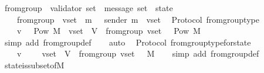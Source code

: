 \begin{isabellebody}
\ from{\isacharunderscore}group\ {\isacharcolon}{\isacharcolon}\ {\isachardoublequoteopen}{\isacharparenleft}validator\ set\ {\isacharasterisk}\ message\ set{\isacharparenright}\ {\isasymRightarrow}\ state{\isachardoublequoteclose}\isanewline
\ \ \isanewline
\ \ \ \ {\isachardoublequoteopen}from{\isacharunderscore}group\ {\isacharequal}\ {\isacharparenleft}{\isasymlambda}{\isacharparenleft}v{\isacharunderscore}set{\isacharcomma}\ {\isasymsigma}{\isacharparenright}{\isachardot}\ {\isacharbraceleft}m\ {\isasymin}\ {\isasymsigma}{\isachardot}\ sender\ m\ {\isasymin}\ v{\isacharunderscore}set{\isacharbraceright}{\isacharparenright}{\isachardoublequoteclose}\isanewline
\isanewline
{}\isamarkupfalse%
\ {\isacharparenleft}\ Protocol{\isacharparenright}\ from{\isacharunderscore}group{\isacharunderscore}type\ {\isacharcolon}\isanewline
\ \ {\isachardoublequoteopen}{\isasymforall}\ {\isasymsigma}\ v{\isachardot}\ {\isasymsigma}\ {\isasymin}\ Pow\ M\ {\isasymand}\ v{\isacharunderscore}set\ {\isasymsubseteq}\ V\ {\isasymlongrightarrow}\ from{\isacharunderscore}group\ {\isacharparenleft}v{\isacharunderscore}set{\isacharcomma}\ {\isasymsigma}{\isacharparenright}\ {\isasymin}\ Pow\ M{\isachardoublequoteclose}\isanewline
%
\isadelimproof
\ \ %
\endisadelimproof
%
\isatagproof
{}\isamarkupfalse%
\ {\isacharparenleft}simp\ add{\isacharcolon}\ from{\isacharunderscore}group{\isacharunderscore}def{\isacharparenright}\isanewline
\ \ \isamarkupfalse%
\ auto%
\endisatagproof
{\isafoldproof}%
%
\isadelimproof
\isanewline
%
\endisadelimproof
\isanewline
{}\isamarkupfalse%
\ {\isacharparenleft}\ Protocol{\isacharparenright}\ from{\isacharunderscore}group{\isacharunderscore}type{\isacharunderscore}for{\isacharunderscore}state\ {\isacharcolon}\isanewline
\ \ {\isachardoublequoteopen}{\isasymforall}\ {\isasymsigma}\ v{\isachardot}\ {\isasymsigma}\ {\isasymin}\ {\isasymSigma}\ {\isasymand}\ v{\isacharunderscore}set\ {\isasymsubseteq}\ V\ {\isasymlongrightarrow}\ from{\isacharunderscore}group\ {\isacharparenleft}v{\isacharunderscore}set{\isacharcomma}\ {\isasymsigma}{\isacharparenright}\ {\isasymsubseteq}\ M{\isachardoublequoteclose}\isanewline
%
\isadelimproof
\ \ %
\endisadelimproof
%
\isatagproof
{}\isamarkupfalse%
\ {\isacharparenleft}simp\ add{\isacharcolon}\ from{\isacharunderscore}group{\isacharunderscore}def{\isacharparenright}\isanewline
\ \ \isamarkupfalse%
\ state{\isacharunderscore}is{\isacharunderscore}subset{\isacharunderscore}of{\isacharunderscore}M\ \isamarkupfalse%

\end{isabellebody}
